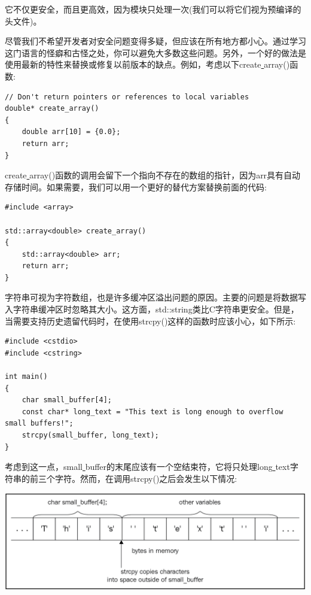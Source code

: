 它不仅更安全，而且更高效，因为模块只处理一次(我们可以将它们视为预编译的头文件)。 \par
尽管我们不希望开发者对安全问题变得多疑，但应该在所有地方都小心。通过学习这门语言的怪癖和古怪之处，你可以避免大多数这些问题。另外，一个好的做法是使用最新的特性来替换或修复以前版本的缺点。例如，考虑以下create\underline{ }array()函数: \par

\begin{lstlisting}[caption={}]
// Don't return pointers or references to local variables
double* create_array()
{
	double arr[10] = {0.0};
	return arr;
}
\end{lstlisting}

create\underline{ }array()函数的调用会留下一个指向不存在的数组的指针，因为arr具有自动存储时间。如果需要，我们可以用一个更好的替代方案替换前面的代码: \par

\begin{lstlisting}[caption={}]
#include <array>

std::array<double> create_array()
{
	std::array<double> arr;
	return arr;
}
\end{lstlisting}

字符串可视为字符数组，也是许多缓冲区溢出问题的原因。主要的问题是将数据写入字符串缓冲区时忽略其大小。这方面，std::string类比C字符串更安全。但是，当需要支持历史遗留代码时，在使用strcpy()这样的函数时应该小心，如下所示: \par

\begin{lstlisting}[caption={}]
#include <cstdio>
#include <cstring>

int main()
{
	char small_buffer[4];
	const char* long_text = "This text is long enough to overflow small buffers!";
	strcpy(small_buffer, long_text);
}
\end{lstlisting}

考虑到这一点，small\underline{ }buffer的末尾应该有一个空结束符，它将只处理long\underline{ }text字符串的前三个字符。然而，在调用strcpy()之后会发生以下情况: \par

\begin{center}
	\includegraphics[width=1.0\textwidth]{content/Section-2/Chapter-12/13}
\end{center}

